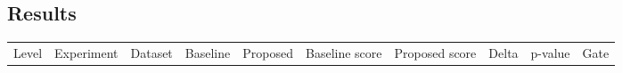 \documentclass[
  11pt,
]{article}
\newcounter{none} %
\begin{document}
\subsection{Results}\label{results}

{\def\LTcaptype{none} %
\begin{longtable}[]{@{}
  >{\raggedright\arraybackslash}p{}
  >{\raggedright\arraybackslash}p{}
  >{\raggedright\arraybackslash}p{}
  >{\raggedright\arraybackslash}p{}
  >{\raggedright\arraybackslash}p{}
  >{\raggedleft\arraybackslash}p{}
  >{\raggedleft\arraybackslash}p{}
  >{\raggedleft\arraybackslash}p{}
  >{\raggedleft\arraybackslash}p{}
  >{\raggedright\arraybackslash}p{}@{}}
\toprule\noalign{}
\begin{minipage}[b]{\linewidth}\raggedright
Level
\end{minipage} & \begin{minipage}[b]{\linewidth}\raggedright
Experiment
\end{minipage} & \begin{minipage}[b]{\linewidth}\raggedright
Dataset
\end{minipage} & \begin{minipage}[b]{\linewidth}\raggedright
Baseline
\end{minipage} & \begin{minipage}[b]{\linewidth}\raggedright
Proposed
\end{minipage} & \begin{minipage}[b]{\linewidth}\raggedleft
Baseline score
\end{minipage} & \begin{minipage}[b]{\linewidth}\raggedleft
Proposed score
\end{minipage} & \begin{minipage}[b]{\linewidth}\raggedleft
Delta
\end{minipage} & \begin{minipage}[b]{\linewidth}\raggedleft
p-value
\end{minipage} & \begin{minipage}[b]{\linewidth}\raggedright
Gate

\end{minipage}
\end{longtable}}
\end{document}
